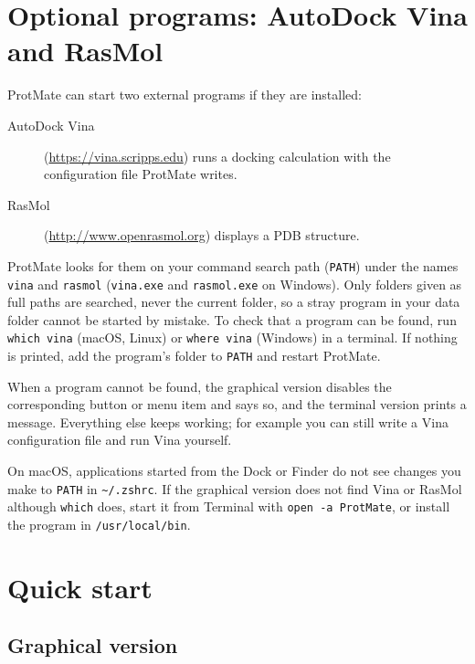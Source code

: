 \documentclass[11pt,a4paper,oneside]{report}
\newcommand{\cmd}[1]{\texttt{#1}}            %
\begin{document}
\chapter{Optional programs: AutoDock Vina and RasMol}\label{ch:external}

ProtMate can start two external programs if they are installed:

\begin{description}
  \item[AutoDock Vina] (\url{https://vina.scripps.edu}) runs a docking calculation with the
        configuration file ProtMate writes.
  \item[RasMol] (\url{http://www.openrasmol.org}) displays a PDB structure.
\end{description}

ProtMate looks for them on your command search path (\cmd{PATH}) under the names \cmd{vina} and
\cmd{rasmol} (\cmd{vina.exe} and \cmd{rasmol.exe} on Windows). Only folders given as full paths
are searched, never the current folder, so a stray program in your data folder cannot be started
by mistake. To check that a program can be found, run \cmd{which vina} (macOS, Linux) or
\cmd{where vina} (Windows) in a terminal. If nothing is printed, add the program's folder to
\cmd{PATH} and restart ProtMate.

When a program cannot be found, the graphical version disables the corresponding button or menu
item and says so, and the terminal version prints a message. Everything else keeps working; for
example you can still write a Vina configuration file and run Vina yourself.

\begin{note}
On macOS, applications started from the Dock or Finder do not see changes you make to
\cmd{PATH} in \cmd{\textasciitilde/.zshrc}. If the graphical version does not find Vina or RasMol
although \cmd{which} does, start it from Terminal with \cmd{open -a ProtMate}, or install the
program in \cmd{/usr/local/bin}.
\end{note}

\chapter{Quick start}

\section{Graphical version}
\end{document}
